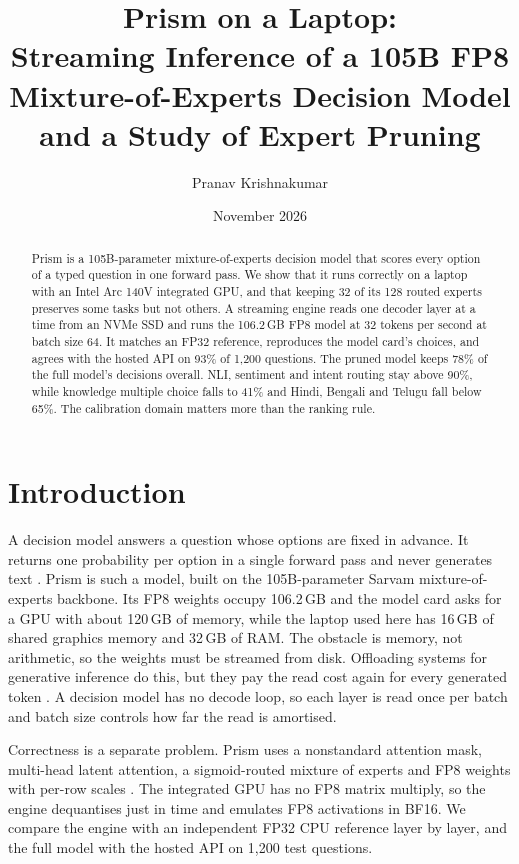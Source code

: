 \documentclass[11pt,a4paper]{article}
\title{\textbf{Prism on a Laptop:}\\[0.25em]
\large Streaming Inference of a 105B FP8 Mixture-of-Experts Decision Model\\[0.25em]
\large and a Study of Expert Pruning}
\author{Pranav Krishnakumar}
\date{November 2026}
\begin{document}
\maketitle

\begin{abstract}
Prism is a 105B-parameter mixture-of-experts decision model that scores every option of a typed question in one forward pass. We show that it runs correctly on a laptop with an Intel Arc 140V integrated GPU, and that keeping 32 of its 128 routed experts preserves some tasks but not others. A streaming engine reads one decoder layer at a time from an NVMe SSD and runs the 106.2\,GB FP8 model at 32 tokens per second at batch size 64. It matches an FP32 reference, reproduces the model card's choices, and agrees with the hosted API on 93\% of 1,200 questions. The pruned model keeps 78\% of the full model's decisions overall. NLI, sentiment and intent routing stay above 90\%, while knowledge multiple choice falls to 41\% and Hindi, Bengali and Telugu fall below 65\%. The calibration domain matters more than the ranking rule.
\end{abstract}

\section{Introduction}

A decision model answers a question whose options are fixed in advance. It returns one probability per option in a single forward pass and never generates text \citep{sarvam2026prism}. Prism is such a model, built on the 105B-parameter Sarvam mixture-of-experts backbone. Its FP8 weights occupy 106.2\,GB and the model card asks for a GPU with about 120\,GB of memory, while the laptop used here has 16\,GB of shared graphics memory and 32\,GB of RAM. The obstacle is memory, not arithmetic, so the weights must be streamed from disk. Offloading systems for generative inference do this, but they pay the read cost again for every generated token \citep{aminabadi2022deepspeed,sheng2023flexgen,song2024powerinfer}. A decision model has no decode loop, so each layer is read once per batch and batch size controls how far the read is amortised.

Correctness is a separate problem. Prism uses a nonstandard attention mask, multi-head latent attention, a sigmoid-routed mixture of experts and FP8 weights with per-row scales \citep{micikevicius2022fp8}. The integrated GPU has no FP8 matrix multiply, so the engine dequantises just in time and emulates FP8 activations in BF16. We compare the engine with an independent FP32 CPU reference layer by layer, and the full model with the hosted API on 1,200 test questions.
\end{document}
